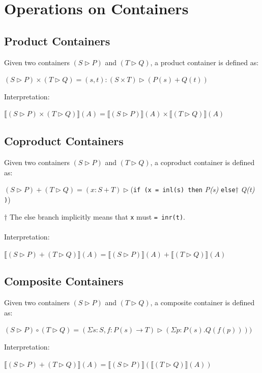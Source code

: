\documentclass[12pt]{report}
\begin{document}
\section{Operations on Containers}
\subsection*{Product Containers}
Given two containers $(S \rhd P)$ and $ (T \rhd Q)$, a product container is defined as:
\begin{center}
$(S \rhd P) \times (T \rhd Q) = (s,t): (S \times T) \rhd (P(s) + Q(t))$
\end{center}
Interpretation:
\begin{center}
$\llbracket (S \rhd P) \times (T \rhd Q) \rrbracket (A)= \llbracket(S \rhd P) \rrbracket (A) \times \llbracket (T \rhd Q) \rrbracket (A)$
\end{center}

\subsection*{Coproduct Containers}
Given two containers $(S \rhd P)$ and $ (T \rhd Q)$, a coproduct container is defined as:
\begin{center}
$(S \rhd P) + (T \rhd Q) = (x:S + T) \rhd $(\texttt{if (x = inl(s) then} \textit{P(s)} \texttt{else}$\dagger$ \textit{Q(t)} \texttt{)})
\end{center}
$\dagger$ The else branch implicitly means that \texttt{x} must \texttt{= inr(t)}.\\
\\
Interpretation:
\begin{center}
$\llbracket (S \rhd P) + (T \rhd Q) \rrbracket (A)= \llbracket(S \rhd P) \rrbracket (A) + \llbracket (T \rhd Q) \rrbracket (A)$
\end{center}


\subsection*{Composite Containers}
Given two containers $(S \rhd P)$ and $ (T \rhd Q)$, a composite container is defined as:
\begin{center}
$(S \rhd P) \circ (T \rhd Q) = (\Sigma s:S,f:P(s) \to T) \rhd (\Sigma p:P(s).Q(f(p))))$
\end{center}
Interpretation:
\begin{center}
$\llbracket (S \rhd P) + (T \rhd Q) \rrbracket (A)= \llbracket(S \rhd P) \rrbracket (\llbracket (T \rhd Q) \rrbracket (A))$
\end{center}
\end{document}
